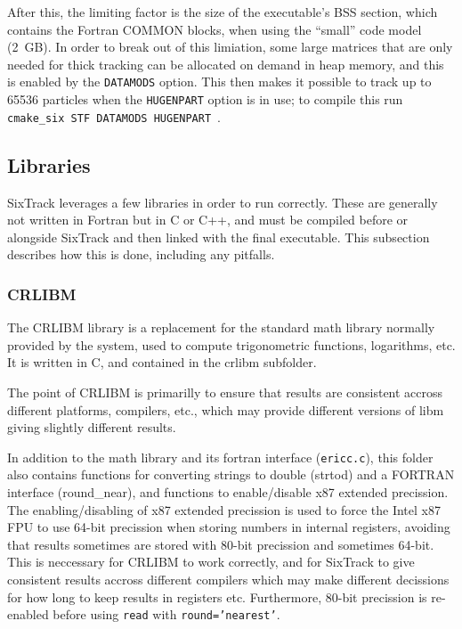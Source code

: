 \documentclass[english]{article}
\begin{document}
After this, the limiting factor is the size of the executable's BSS section, which contains the Fortran COMMON blocks, when using the ``small'' code model (2~GB).
In order to break out of this limiation, some large matrices that are only needed for thick tracking can be allocated on demand in heap memory, and this is enabled by the \texttt{DATAMODS} option.
This then makes it possible to track up to 65536 particles when the \texttt{HUGENPART} option is in use; to compile this run \texttt{cmake\_six STF DATAMODS HUGENPART}~.


\subsection{Libraries}
SixTrack leverages a few libraries in order to run correctly.
These are generally not written in Fortran but in C or C++, and must be compiled before or alongside SixTrack and then linked with the final executable.
This subsection describes how this is done, including any pitfalls.

\subsubsection{CRLIBM}
\label{sec:building:libs:crlibm}
The CRLIBM library  is a replacement for the standard math library normally provided by the system, used to compute trigonometric functions, logarithms, etc.
It is written in C, and contained in the \textrm{crlibm} subfolder.

The point of CRLIBM is primarilly to ensure that results are consistent accross different platforms, compilers, etc., which may provide different versions of libm giving slightly different results.

In addition to the math library and its fortran interface (\texttt{ericc.c}), this folder also contains functions for converting strings to double (\textrm{strtod}) and a FORTRAN interface (\textrm{round\_near}), and functions to enable/disable x87 extended precission.
The enabling/disabling of x87 extended precission is used to force the Intel x87 FPU to use 64-bit precission when storing numbers in internal registers, avoiding that results sometimes are stored with 80-bit precission and sometimes 64-bit.
This is neccessary for CRLIBM to work correctly, and for SixTrack to give consistent results accross different compilers which may make different decissions for how long to keep results in registers etc.
Furthermore, 80-bit precission is re-enabled before using \texttt{read} with \texttt{round='nearest'}.
\end{document}

